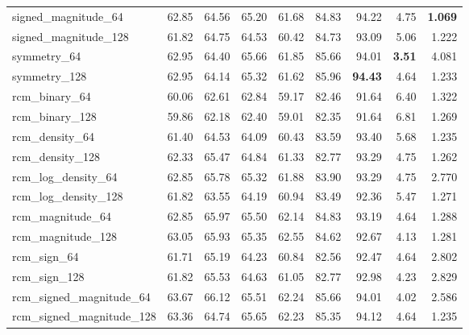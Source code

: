 \begin{table}[H]
{\begin{tabular}{lrrrrrrrr}
    signed\_magnitude\_64    & 62.85 & 64.56 & 65.20 & 61.68 & 84.83 & 94.22 & 4.75 & \textbf{1.069} \\
    signed\_magnitude\_128   & 61.82 & 64.75 & 64.53 & 60.42 & 84.73 & 93.09 & 5.06 & 1.222 \\
    symmetry\_64             & 62.95 & 64.40 & 65.66 & 61.85 & 85.66 & 94.01 & \textbf{3.51} & 4.081 \\
    symmetry\_128            & 62.95 & 64.14 & 65.32 & 61.62 & 85.96 & \textbf{94.43} & 4.64 & 1.233 \\
    \midrule
    rcm\_binary\_64          & 60.06 & 62.61 & 62.84 & 59.17 & 82.46 & 91.64 & 6.40 & 1.322 \\
    rcm\_binary\_128         & 59.86 & 62.18 & 62.40 & 59.01 & 82.35 & 91.64 & 6.81 & 1.269 \\
    rcm\_density\_64         & 61.40 & 64.53 & 64.09 & 60.43 & 83.59 & 93.40 & 5.68 & 1.235 \\
    rcm\_density\_128        & 62.33 & 65.47 & 64.84 & 61.33 & 82.77 & 93.29 & 4.75 & 1.262 \\
    rcm\_log\_density\_64    & 62.85 & 65.78 & 65.32 & 61.88 & 83.90 & 93.29 & 4.75 & 2.770 \\
    rcm\_log\_density\_128   & 61.82 & 63.55 & 64.19 & 60.94 & 83.49 & 92.36 & 5.47 & 1.271 \\
    rcm\_magnitude\_64       & 62.85 & 65.97 & 65.50 & 62.14 & 84.83 & 93.19 & 4.64 & 1.288 \\
    rcm\_magnitude\_128      & 63.05 & 65.93 & 65.35 & 62.55 & 84.62 & 92.67 & 4.13 & 1.281 \\
    rcm\_sign\_64            & 61.71 & 65.19 & 64.23 & 60.84 & 82.56 & 92.47 & 4.64 & 2.802 \\
    rcm\_sign\_128           & 61.82 & 65.53 & 64.63 & 61.05 & 82.77 & 92.98 & 4.23 & 2.829 \\
    rcm\_signed\_magnitude\_64  & 63.67 & 66.12 & 65.51 & 62.24 & 85.66 & 94.01 & 4.02 & 2.586 \\
    rcm\_signed\_magnitude\_128 & 63.36 & 64.74 & 65.65 & 62.23 & 85.35 & 94.12 & 4.64 & 1.235 \\
    \bottomrule
  \end{tabular}%
  }
\end{table}

